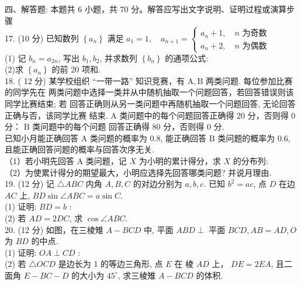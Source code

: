 \documentclass[UTF8]{ctexart}
\begin{document}
	四、解答题: 本题共 6 小题，共 70 分。解答应写出文字说明、证明过程或演算步骤\\
	
	17. (10 分)
	已知数列 $\left\{a_{n}\right\}$ 满足 $a_{1}=1, \quad a_{n+1}=\left\{\begin{array}{l}a_{n}+1, \quad n \text { 为奇数 } \\ a_{n}+2, \quad n \text { 为偶数 }\end{array}\right.$\\
	
	(1) 记 $b_{n}=a_{2 n}$, 写出 $b_{1}, b_{2}$, 并求数列 $\left\{b_{n}\right\}$ 的通项公式:\\
	
	(2)求 $\left\{a_{n}\right\}$ 的前 20 项和.\\
	
	18. ( 12 分)
	某学校组织 “一带一路” 知识竞赛，有 $\mathrm{A}, \mathrm{B}$ 两类问题. 每位参加比赛的同学先在
	两类问题中选择一类并从中随机抽取一个问题回答，若回答错误则该同学比赛结束; 若
	回答正确则从另一类问题中再随机抽取一个问题回答, 无论回答正确与否，该同学比赛
	结束. $\mathrm{A}$ 类问题中的每个问题回答正确得 20 分，否则得 0 分： $\mathrm{B}$ 类问题中的每个问题
	回答正确得 80 分，否则得 0 分.\\
	已知小月能正确回答 $\mathrm{A}$ 类问题的概率为 $0.8$, 能正确回答 $\mathrm{B}$ 类问题的概率为 $0.6$,
	且能正确回答问题的概率与回答次序无关.\\
	（1）若小明先回答 $\mathrm{A}$ 类问题，记 $X$ 为小明的累计得分，求 $X$ 的分布列:\\
	（2）为使累计得分的期望最大，小明应选择先回答哪类问题? 并说月理由.\\
	
	19. (12 分)
	记 $\triangle A B C$ 内角 $A, B, C$ 的对边分别为 $a, b, c .$ 已知 $b^{2}=a c$, 点 $D$ 在边 $A C$
	上, $B D \sin \angle A B C=a \sin C$.\\
	
	(1) 证明: $B D=b$ :\\
	
	(2) 若 $A D=2 D C$, 求 $\cos \angle A B C$.\\
	
	20. (12 分)
	如图，在三棱雉 $A-B C D$ 中, 平面 $A B D \perp$ 平面
	$B C D, A B=A D, O$ 为 $B D$ 的中点.\\
	
	(1) 证明: $O A \perp C D$ :\\
	
	(2) 若 $\triangle O C D$ 是边长为 1 的等边三角形, 点 $E$ 在
	棱 $A D$ 上， $D E=2 E A$, 且二面角 $E-B C-D$ 的大小为
	$45^{\circ}$, 求三棱雉 $A-B C D$ 的体积.\\
	
\end{document}
